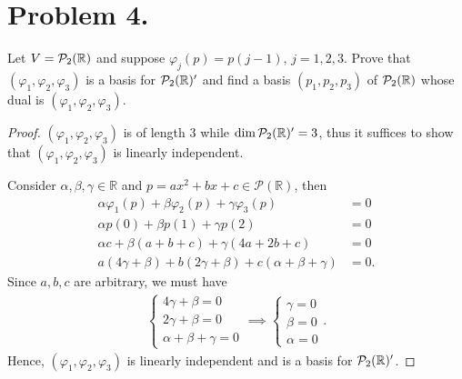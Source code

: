 \documentclass{article}
\begin{document}
\section*{Problem 4.}
Let $V={\cal P}_2(\mathbb{R})$ and suppose $\varphi_j(p)=p(j-1)$, $j=1,2,3$.
Prove that $(\varphi_1, \varphi_2, \varphi_3)$ is a basis for ${\cal P}_2(\mathbb{R})'$ and find a 
basis $(p_1,p_2,p_3)$ of ${\cal P}_2(\mathbb{R})$ whose dual is $(\varphi_1, \varphi_2, \varphi_3)$.
\begin{proof}
    $(\varphi_1, \varphi_2, \varphi_3)$ is of length 3 while $\dim{\cal P}_2(\mathbb{R})'=3$, thus 
    it suffices to show that $(\varphi_1, \varphi_2, \varphi_3)$ is linearly 
    independent.

    Consider $\alpha, \beta, \gamma\in\mathbb{R}$ and $p = ax^2+bx+c\in\mathcal{P}(\mathbb{R})$, then 
    \begin{align*}
        \alpha\varphi_1(p) + \beta\varphi_2(p) + \gamma\varphi_3(p) & = 0 \\
        \alpha p(0) + \beta p(1) + \gamma p(2) & = 0 \\
        \alpha c + \beta(a+b+c) + \gamma(4a+2b+c) & = 0 \\
        a(4\gamma+\beta) + b(2\gamma+\beta) + c(\alpha+\beta+\gamma) & = 0.
    \end{align*}
    Since $a, b, c$ are arbitrary, we must have
    \begin{align*}
        \begin{cases}
            4\gamma+\beta = 0 \\
            2\gamma+\beta = 0 \\
            \alpha+\beta+\gamma = 0
        \end{cases}
        \implies 
        \begin{cases}
            \gamma = 0 \\
            \beta = 0 \\
            \alpha = 0
        \end{cases}.
    \end{align*}
    Hence, $(\varphi_1, \varphi_2, \varphi_3)$ is linearly independent and is a basis for
    ${\cal P}_2(\mathbb{R})'$.


\end{proof}
\end{document}

